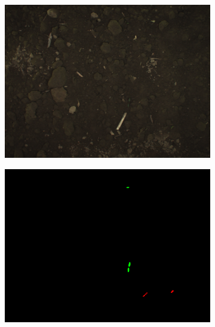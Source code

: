 \documentclass[letterpaper, 10 pt, conference]{ieeeconf}  %
\begin{document}
    
    
    \begin{figure}
	\vspace{1em} 
    \centering
     \begin{subfigure}[b]{0.49\linewidth}
    \includegraphics[width=\linewidth]{pics/bonn/images/bonirob_2016-04-28-12-20-29_6_frame217.png}
   		\caption{}
		\label{bonn_img}    		
    \vspace{1em}
   \end{subfigure}
        \begin{subfigure}[b]{0.49\linewidth}
    \includegraphics[width=\linewidth]{pics/bonn/annotations/bonirob_2016-04-28-12-20-29_6_frame217.png}
   		\caption{}
		\label{bonn_lbl}    		

\end{subfigure}
\end{figure}
\end{document}
